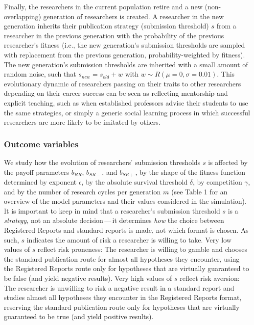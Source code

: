 \documentclass[british,,man,floatsintext]{apa6}
\begin{document}
Finally, the researchers in the current population retire and a new (non-overlapping) generation of researchers is created.
A researcher in the new generation inherits their publication strategy (submission threshold) \(s\) from a researcher in the previous generation with the probability of the previous researcher's fitness (i.e., the new generation's submission thresholds are sampled with replacement from the previous generation, probability-weighted by fitness).
The new generation's submission thresholds are inherited with a small amount of random noise, such that \(s_{new} = s_{old} + w\) with \(w \sim R(\mu = 0, \sigma = 0.01)\).
This evolutionary dynamic of researchers passing on their traits to other researchers depending on their career success can be seen as reflecting mentorship and explicit teaching, such as when established professors advise their students to use the same strategies, or simply a generic social learning process in which successful researchers are more likely to be imitated by others.

\hypertarget{outcome-variables}{%
\subsubsection{Outcome variables}\label{outcome-variables}}

We study how the evolution of researchers' submission thresholds \(s\) is affected by the payoff parameters \(b_{RR}\), \(b_{SR-}\), and \(b_{SR+}\), by the shape of the fitness function determined by exponent \(\epsilon\), by the absolute survival threshold \(\delta\), by competition \(\gamma\), and by the number of research cycles per generation \(m\) (see Table 1 for an overview of the model parameters and their values considered in the simulation).
It is important to keep in mind that a researcher's submission threshold \(s\) is a \emph{strategy}, not an absolute decision\(\,\)---\(\,\)it determines \emph{how} the choice between Registered Reports and standard reports is made, not which format is chosen.
As such, \(s\) indicates the amount of risk a researcher is willing to take.
Very low values of \(s\) reflect risk proneness:
The researcher is willing to gamble and chooses the standard publication route for almost all hypotheses they encounter, using the Registered Reports route only for hypotheses that are virtually guaranteed to be false (and yield negative results).
Very high values of \(s\) reflect risk aversion:
The researcher is unwilling to risk a negative result in a standard report and studies almost all hypotheses they encounter in the Registered Reports format, reserving the standard publication route only for hypotheses that are virtually guaranteed to be true (and yield positive results).
\end{document}
